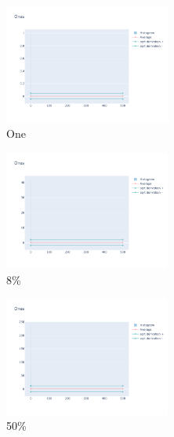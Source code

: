 \documentclass[12pt, fleqn]{report}                             %
\theoremstyle{break}                                            %
\begin{document}
      \begin{figure}[ht!]
        \centering
        \begin{subfigure}[b]{0.4\linewidth}
          \includegraphics[width=0.6\textwidth]{Images/128/dia-a.png}
          \caption{One}
        \end{subfigure}
        \begin{subfigure}[b]{0.4\linewidth}
          \includegraphics[width=0.6\textwidth]{Images/128/dia-b.png}
          \caption{8\%}
        \end{subfigure}
        \begin{subfigure}[b]{0.4\linewidth}
          \includegraphics[width=0.6\textwidth]{Images/128/dia-c.png}
          \caption{50\%}
        \end{subfigure}
        \begin{subfigure}[b]{0.4\linewidth}

\end{subfigure}
\end{figure}
\end{document}
